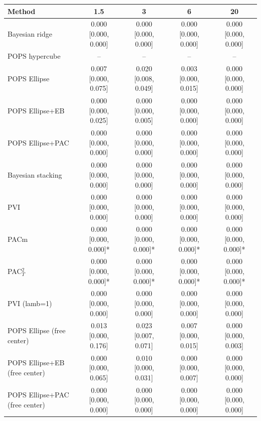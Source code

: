 \begin{tabular}{lcccc}
\toprule
Method & 1.5 & 3 & 6 & 20 \\
\midrule
Bayesian ridge & 0.000 {\scriptsize[0.000, 0.000]} & 0.000 {\scriptsize[0.000, 0.000]} & 0.000 {\scriptsize[0.000, 0.000]} & 0.000 {\scriptsize[0.000, 0.000]} \\
POPS hypercube & -- & -- & -- & -- \\
POPS Ellipse & 0.007 {\scriptsize[0.000, 0.075]} & 0.020 {\scriptsize[0.008, 0.049]} & 0.003 {\scriptsize[0.000, 0.015]} & 0.000 {\scriptsize[0.000, 0.000]} \\
POPS Ellipse+EB & 0.000 {\scriptsize[0.000, 0.025]} & 0.000 {\scriptsize[0.000, 0.005]} & 0.000 {\scriptsize[0.000, 0.000]} & 0.000 {\scriptsize[0.000, 0.000]} \\
POPS Ellipse+PAC & 0.000 {\scriptsize[0.000, 0.000]} & 0.000 {\scriptsize[0.000, 0.000]} & 0.000 {\scriptsize[0.000, 0.000]} & 0.000 {\scriptsize[0.000, 0.000]} \\
Bayesian stacking & 0.000 {\scriptsize[0.000, 0.000]} & 0.000 {\scriptsize[0.000, 0.000]} & 0.000 {\scriptsize[0.000, 0.000]} & 0.000 {\scriptsize[0.000, 0.000]} \\
PVI & 0.000 {\scriptsize[0.000, 0.000]} & 0.000 {\scriptsize[0.000, 0.000]} & 0.000 {\scriptsize[0.000, 0.000]} & 0.000 {\scriptsize[0.000, 0.000]} \\
PACm & 0.000 {\scriptsize[0.000, 0.000]}* & 0.000 {\scriptsize[0.000, 0.000]}* & 0.000 {\scriptsize[0.000, 0.000]}* & 0.000 {\scriptsize[0.000, 0.000]}* \\
PAC$^2_T$ & 0.000 {\scriptsize[0.000, 0.000]}* & 0.000 {\scriptsize[0.000, 0.000]}* & 0.000 {\scriptsize[0.000, 0.000]}* & 0.000 {\scriptsize[0.000, 0.000]}* \\
PVI (lamb=1) & 0.000 {\scriptsize[0.000, 0.000]} & 0.000 {\scriptsize[0.000, 0.000]} & 0.000 {\scriptsize[0.000, 0.000]} & 0.000 {\scriptsize[0.000, 0.000]} \\
POPS Ellipse (free center) & 0.013 {\scriptsize[0.000, 0.176]} & 0.023 {\scriptsize[0.007, 0.071]} & 0.007 {\scriptsize[0.000, 0.015]} & 0.000 {\scriptsize[0.000, 0.003]} \\
POPS Ellipse+EB (free center) & 0.000 {\scriptsize[0.000, 0.065]} & 0.010 {\scriptsize[0.000, 0.031]} & 0.000 {\scriptsize[0.000, 0.007]} & 0.000 {\scriptsize[0.000, 0.000]} \\
POPS Ellipse+PAC (free center) & 0.000 {\scriptsize[0.000, 0.000]} & 0.000 {\scriptsize[0.000, 0.000]} & 0.000 {\scriptsize[0.000, 0.000]} & 0.000 {\scriptsize[0.000, 0.000]} \\
\bottomrule
\end{tabular}


